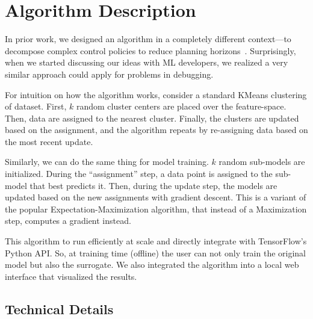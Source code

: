 \section{Algorithm Description}
In prior work, we designed an algorithm in a completely different context---to decompose complex control policies to reduce planning horizons~\cite{DBLP:journals/corr/KrishnanGLMPG16, Krishnan17}. Surprisingly, when we started discussing our ideas with ML developers, we realized a very similar approach could apply for problems in debugging. 

For intuition on how the algorithm works, consider a standard KMeans clustering of dataset. First, $k$ random cluster centers are placed over the feature-space. Then, data are assigned to the nearest cluster. Finally, the clusters are updated based on the assignment, and the algorithm repeats by re-assigning data based on the most recent update.

Similarly, we can do the same thing for model training. $k$ random sub-models are initialized.
During the ``assignment'' step, a data point is assigned to the sub-model that best predicts it.
Then, during the update step, the models are updated based on the new assignments with gradient descent.
This is a variant of the popular Expectation-Maximization algorithm, that instead of a Maximization step, computes a gradient instead. 

This algorithm to run efficiently at scale and directly integrate with TensorFlow's Python API.
So, at training time (offline) the user can not only train the original model but also the surrogate.
We also integrated the algorithm into a local web interface that visualized the results.


\subsection{Technical Details}

